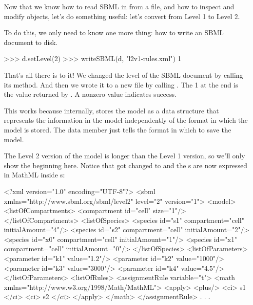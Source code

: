 \documentclass{sbmlmanual}
\begin{document}
Now that we know how to read SBML in from a file, and how to
inspect and modify \libsbml{} objects, let's do something
useful: let's convert  from Level 1 to Level 2.

To do this, we only need to know one more thing: how to write
an SBML document to disk.  

\begin{shellVerbatim}
>>> d.setLevel(2)
>>> writeSBML(d, "l2v1-rules.xml")
1
\end{shellVerbatim}

That's all there is to it!  We changed the level of the SBML
document by calling its  method.  And then we wrote
it to a new file by calling .  The 1 at the end is
the value returned by .  A nonzero value indicates
success.

This works because internally, \libsbml{} stores the model as a data structure
that represents the information in the model independently of the format in
which the model is stored.  The  data member just tells
 the format in which to save the model.

The Level 2 version of the model is longer than the Level 1 version, so we'll
only show the beginning here.  Notice that  got changed to
 and the s are now expressed in MathML
inside s:

\begin{boxedCodeVerbatim}
<?xml version="1.0" encoding="UTF-8"?>
<sbml xmlns="http://www.sbml.org/sbml/level2" level="2" version="1">
  <model>
    <listOfCompartments>
      <compartment id="cell" size="1"/>
    </listOfCompartments>
    <listOfSpecies>
      <species id="s1" compartment="cell" initialAmount="4"/>
      <species id="s2" compartment="cell" initialAmount="2"/>
      <species id="x0" compartment="cell" initialAmount="1"/>
      <species id="x1" compartment="cell" initialAmount="0"/>
    </listOfSpecies>
    <listOfParameters>
      <parameter id="k1" value="1.2"/>
      <parameter id="k2" value="1000"/>
      <parameter id="k3" value="3000"/>
      <parameter id="k4" value="4.5"/>
    </listOfParameters>
    <listOfRules>
      <assignmentRule variable="t">
        <math xmlns="http://www.w3.org/1998/Math/MathML">
          <apply>
            <plus/>
            <ci> s1 </ci>
            <ci> s2 </ci>
          </apply>
        </math>
      </assignmentRule>
      . . .
\end{boxedCodeVerbatim}
\end{document}
